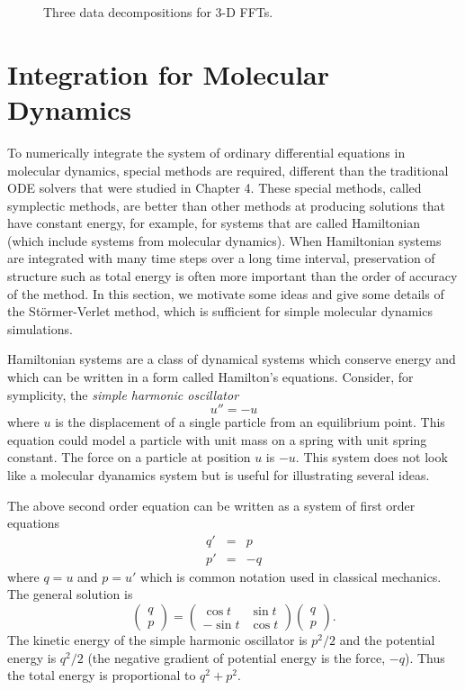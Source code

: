\begin{figure}[htbp]
\begin{center}
\caption{Three data decompositions for 3-D FFTs.}
\label{fig:fft3}
\end{center}
\end{figure}

\section{Integration for Molecular Dynamics}

To numerically integrate the system of ordinary differential
equations in molecular dynamics, special methods are required,
different than the traditional ODE solvers that were studied in
Chapter 4.  These special methods, called symplectic methods,
are better than other methods at producing solutions that have
constant energy, for example, for systems that are called
Hamiltonian (which include systems from molecular dynamics).  
When Hamiltonian systems are integrated with many time steps
over a long time interval, preservation of structure such as
total energy is often more important than the order of accuracy
of the method.  In this section, we motivate some ideas and
give some details of the St\"{o}rmer-Verlet method, which is sufficient
for simple molecular dynamics simulations.

Hamiltonian systems are a class of dynamical systems
which conserve energy and which can be written in a form
called Hamilton's equations.  Consider, for symplicity, the {\em simple
harmonic oscillator}
\[
u'' = -u
\]
where $u$ is the displacement of a single particle from an equilibrium
point.  This equation could model a particle with unit mass on a spring
with unit spring constant.  The force on a particle at position $u$ is
$-u$.
This system does not look like a molecular dyanamics system but
is useful for illustrating several ideas.

The above second order equation can be written
as a system of first order equations
\begin{eqnarray*}
q' &=& p \\
p' &=& -q 
\end{eqnarray*}
where $q = u$ and $p=u'$ which is common notation used
in classical mechanics.  The general solution is
\[
\left( \begin{array}{c} q \\ p \end{array} \right)
=
\left( \begin{array}{rr}  \cos t & \sin t \\
                         -\sin t & \cos t \end{array} \right)
\left( \begin{array}{c} q \\ p \end{array} \right) .
\]
The kinetic energy of the simple harmonic oscillator is
$p^2/2$ and the potential energy is $q^2/2$ (the negative 
gradient of potential energy is the force, $-q$).
Thus the total energy is proportional to
$q^2 + p^2$.

